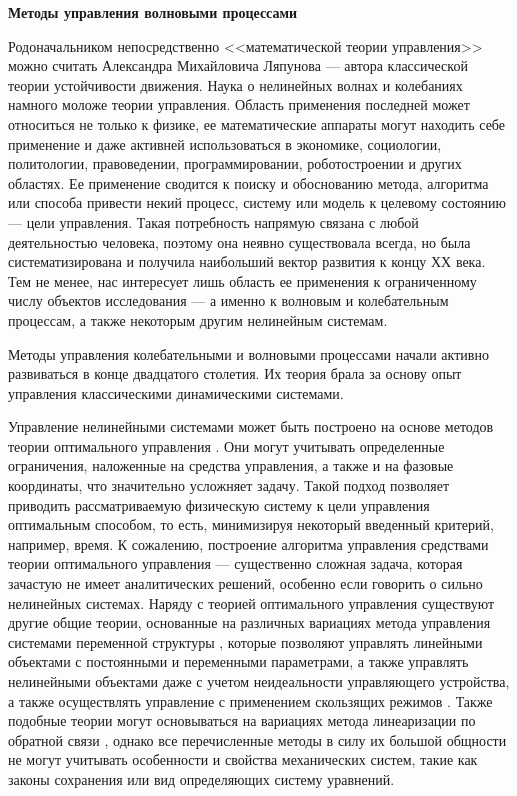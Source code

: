 \textbf{Методы управления волновыми процессами}

Родоначальником непосредственно <<математической теории управления>> можно считать Александра Михайловича Ляпунова --- автора классической теории устойчивости движения. 
Наука о нелинейных волнах и колебаниях намного моложе теории управления. Область применения последней может относиться не только к физике, ее математические аппараты могут находить себе применение и даже активней использоваться в экономике, социологии, политологии, правоведении, программировании, роботостроении и других областях. Ее применение сводится к поиску и обоснованию метода, алгоритма или способа привести некий процесс, систему или модель к целевому состоянию --- цели управления. Такая потребность напрямую связана с любой деятельностью человека, поэтому она неявно существовала всегда, но была систематизирована и получила наибольший вектор развития к концу ХХ века. Тем не менее, нас интересует лишь область ее применения к ограниченному числу объектов исследования --- а именно к волновым и колебательным процессам, а также некоторым другим нелинейным системам.

Методы управления колебательными и волновыми процессами начали активно развиваться в конце двадцатого столетия. Их теория брала за основу опыт управления классическими динамическими системами. 

Управление нелинейными системами может быть построено на основе методов теории оптимального управления \cite{intro_alekseev}. Они могут учитывать определенные ограничения, наложенные на средства управления, а также и на фазовые координаты, что значительно усложняет задачу. Такой подход позволяет приводить рассматриваемую физическую систему к цели управления оптимальным способом, то есть, минимизируя некоторый введенный критерий, например, время. К сожалению, построение алгоритма управления средствами теории оптимального управления --- существенно сложная задача, которая зачастую не имеет аналитических решений, особенно если говорить о сильно нелинейных системах.
Наряду с теорией оптимального управления существуют другие общие теории, основанные на различных вариациях метода управления системами переменной структуры \cite{intro_emel}, которые позволяют управлять линейными объектами с постоянными и переменными параметрами, а также управлять нелинейными объектами даже с учетом неидеальности управляющего устройства, а также осуществлять управление с применением скользящих режимов \cite{intro_utkin}. Также подобные теории могут основываться на вариациях метода линеаризации по обратной связи \cite{isidori1995nonlinear}, однако все перечисленные методы в силу их большой общности не могут учитывать особенности и свойства механических систем, такие как законы сохранения или вид определяющих систему уравнений.

